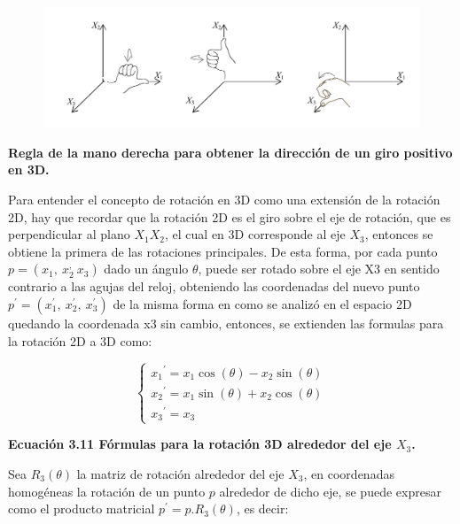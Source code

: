 \begin{figure}[h]
\includegraphics[width=14cm]{Img/GEO/geo-mano.jpg}
\centering
\end{figure}
\begin{center}
\textbf{\footnotesize{Regla de la mano derecha para obtener la dirección de un giro positivo en 3D.}}
\end{center}


Para entender el concepto de rotación en 3D como una extensión de la rotación 2D, hay que recordar que la rotación 2D es el giro sobre el eje de rotación, que es perpendicular al plano $X_{1}X_{2}$, el cual en 3D corresponde al eje $X_{3}$, entonces se obtiene la primera de las rotaciones principales.
De esta forma, por cada punto
$p = (x_{1},\ x_{2}^,\ x_{3})$ dado un ángulo $\theta$, puede ser rotado sobre el eje X3 en sentido contrario a las agujas del reloj, obteniendo las coordenadas del nuevo punto $p^{\prime} = (x_{1}^{\prime},\ x_{2}^{\prime},\ x_{3}^{\prime})$ de la misma forma en como se analizó en el espacio 2D quedando la coordenada x3 sin cambio, entonces, se extienden las formulas para la rotación 2D a 3D como: 

$$
\begin{cases}
{x_{1}}^{\prime} = x_{1} \cos(\theta) -x_{2} \sin(\theta) \\ 
{x_{2}}^{\prime} = x_{1} \sin(\theta) +x_{2} \cos(\theta) \\
{x_{3}}^{\prime} = x_{3}
\end{cases}
$$

\begin{center}
\textbf{Ecuación 3.11 \footnotesize{Fórmulas para la rotación 3D alrededor del eje $X_{3}$.}}
\end{center}

Sea $R_{3}(\theta)$ la matriz de rotación alrededor del eje $X_{3}$, en coordenadas homogéneas la rotación de un punto $p$ alrededor de dicho eje, se puede expresar como el producto matricial
$p^{\prime} = p.R_{3}(\theta)$, es decir:



